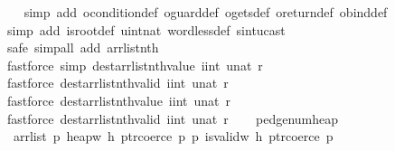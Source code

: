 \begin{isabellebody}
\ \ \isamarkupfalse%
\ {\isacharparenleft}simp\ add{\isacharcolon}\ ocondition{\isacharunderscore}def\ oguard{\isacharunderscore}def\ ogets{\isacharunderscore}def\ oreturn{\isacharunderscore}def\ obind{\isacharunderscore}def{\isacharparenright}\isanewline
\ \ \isamarkupfalse%
\ {\isacharparenleft}simp\ add{\isacharcolon}\ is{\isacharunderscore}root{\isacharunderscore}def\ uint{\isacharunderscore}nat\ word{\isacharunderscore}less{\isacharunderscore}def\ sint{\isacharunderscore}ucast{\isacharparenright}\isanewline
\ \ \isamarkupfalse%
\ {\isacharparenleft}safe{\isacharcomma}\ simp{\isacharunderscore}all\ add{\isacharcolon}\ arrlist{\isacharunderscore}nth{\isacharparenright}\ \ \isanewline
\ \ \ \ \ \isamarkupfalse%
\ {\isacharparenleft}fastforce\ simp{\isacharcolon}\ dest{\isacharcolon}arrlist{\isacharunderscore}nth{\isacharunderscore}value{\isacharbrackleft}\ i{\isacharequal}{\isachardoublequoteopen}int\ {\isacharparenleft}unat\ r{\isacharparenright}{\isachardoublequoteclose}{\isacharbrackright}{\isacharparenright}\isanewline
\ \ \ \ \isamarkupfalse%
\ {\isacharparenleft}fastforce\ dest{\isacharcolon}arrlist{\isacharunderscore}nth{\isacharunderscore}valid{\isacharbrackleft}\ i{\isacharequal}{\isachardoublequoteopen}int\ {\isacharparenleft}unat\ r{\isacharparenright}{\isachardoublequoteclose}{\isacharbrackright}{\isacharparenright}\isanewline
\ \ \ \isamarkupfalse%
\ {\isacharparenleft}fastforce\ dest{\isacharcolon}arrlist{\isacharunderscore}nth{\isacharunderscore}value{\isacharbrackleft}\ i{\isacharequal}{\isachardoublequoteopen}int\ {\isacharparenleft}unat\ r{\isacharparenright}{\isachardoublequoteclose}{\isacharbrackright}{\isacharparenright}\isanewline
\ \ \isamarkupfalse%
\ {\isacharparenleft}fastforce\ dest{\isacharcolon}arrlist{\isacharunderscore}nth{\isacharunderscore}valid{\isacharbrackleft}\ i{\isacharequal}{\isachardoublequoteopen}int\ {\isacharparenleft}unat\ r{\isacharparenright}{\isachardoublequoteclose}{\isacharbrackright}{\isacharparenright}\isanewline
\ \ \isamarkupfalse%
%
\endisatagproof
{\isafoldproof}%
%
\isadelimproof
\isanewline
%
\endisadelimproof
\isanewline
\isanewline
{}\isamarkupfalse%
\ pedge{\isacharunderscore}num{\isacharunderscore}heap{\isacharcolon}\isanewline
\ \ {\isachardoublequoteopen}{\isasymlbrakk}arrlist\ {\isacharparenleft}{\isasymlambda}p{\isachardot}\ heap{\isacharunderscore}w{}{}\ h\ {\isacharparenleft}ptr{\isacharunderscore}coerce\ p{\isacharparenright}{\isacharparenright}\ {\isacharparenleft}{\isasymlambda}p{\isachardot}\ is{\isacharunderscore}valid{\isacharunderscore}w{}{}\ h\ {\isacharparenleft}ptr{\isacharunderscore}coerce\ p{\isacharparenright}{\isacharparenright}\ \isanewline

\end{isabellebody}
